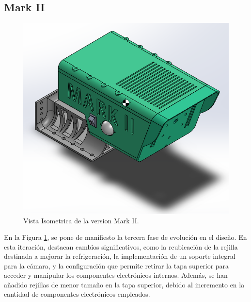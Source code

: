 \subsection{Mark II}
    \begin{figure}[H]
    \centering
    \begin{adjustbox}{width=\linewidth/2}
      \includegraphics{media/Mark__02.png}
    \end{adjustbox}
    \caption{\label{fig:isometrico_Mark02}Vista Isometrica de la version Mark II.}
    \end{figure}

    En la Figura \ref{fig:isometrico_Mark02}, se pone de manifiesto la tercera fase de evolución en el diseño. En esta iteración, destacan cambios significativos, como la reubicación de la rejilla destinada a mejorar la refrigeración, la implementación de un soporte integral para la cámara, y la configuración que permite retirar la tapa superior para acceder y manipular los componentes electrónicos internos. Además, se han añadido rejillas de menor tamaño en la tapa superior, debido al incremento en la cantidad de componentes electrónicos empleados.

